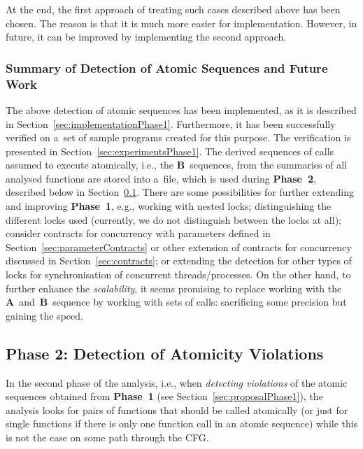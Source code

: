 At the end, the first approach of treating such cases described above has
been chosen. The reason is that it is much more easier for implementation.
However, in future, it can be improved by implementing the second approach.

\subsubsection{Summary of Detection of Atomic Sequences and Future Work}

The above detection of atomic sequences has been implemented, as it is 
described in Section~\ref{sec:implementationPhase1}. Furthermore, it has 
been successfully verified on a~set of sample programs created for
this purpose. The verification is presented in
Section~\ref{sec:experimentsPhase1}. The derived sequences of calls
assumed to execute atomically, i.e., the \textbf{B}~sequences, from the
summaries of all analysed functions are stored into a~file, which is used 
during \textbf{Phase~2}, described below in Section~\ref{sec:proposalPhase2}.
There are some possibilities for further extending and improving
\textbf{Phase~1}, e.g., working with nested locks; distinguishing the 
different locks used (currently, we do not distinguish between the locks at
all); consider contracts for concurrency with parameters defined in
Section~\ref{sec:parameterContracts} or other extension of contracts for
concurrency discussed in Section~\ref{sec:contracts}; or extending the 
detection for other types of locks for synchronisation of concurrent
threads/processes. On the other hand, to further enhance the 
\emph{scalability}, it seems promising to replace working with the
\textbf{A}~and~\textbf{B}~sequence by working with sets of calls: sacrificing
some precision but gaining the speed.


\subsection{Phase 2: Detection of Atomicity Violations}
\label{sec:proposalPhase2}

In the second phase of the analysis, i.e., when \emph{detecting 
violations} of the atomic sequences obtained from \textbf{Phase~1} 
(see Section~\ref{sec:proposalPhase1}), the analysis looks for pairs of
functions that should be called atomically (or just for single functions 
if there is only one function call in an atomic sequence) while this is 
not the case on some path through the CFG.

